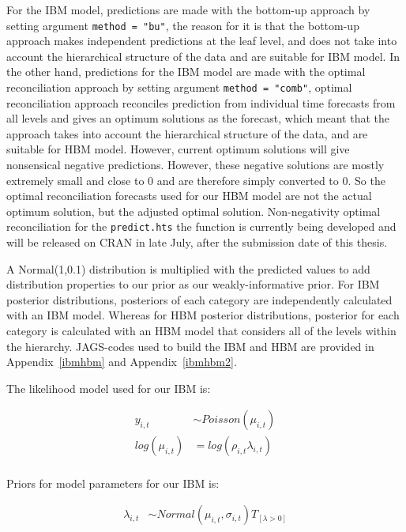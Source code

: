 For the IBM model, predictions are made with the bottom-up approach by setting argument \texttt{method = "bu"}, the reason for it is that the bottom-up approach makes independent predictions at the leaf level, and does not take into account the hierarchical structure of the data and are suitable for IBM model. In the other hand, predictions for the IBM model are made with the optimal reconciliation approach by setting argument \texttt{method = "comb"}, optimal reconciliation approach reconciles prediction from individual time forecasts from all levels and gives an optimum solutions as the forecast, which meant that the approach takes into account the hierarchical structure of the data, and are suitable for HBM model. However, current optimum solutions will give nonsensical negative predictions. However, these negative solutions are mostly extremely small and close to 0 and are therefore simply converted to 0. So the optimal reconciliation forecasts used for our HBM model are not the actual optimum solution, but the adjusted optimal solution. Non-negativity optimal reconciliation for the \texttt{predict.hts} the function is currently being developed and will be released on CRAN in late July, after the submission date of this thesis. 

\newpara

A Normal(1,0.1) distribution is multiplied with the predicted values to add distribution properties to our prior as our weakly-informative prior. For IBM posterior distributions, posteriors of each category are independently calculated with an IBM model. Whereas for HBM posterior distributions, posterior for each category is calculated with an HBM model that considers all of the levels within the hierarchy. JAGS-codes used to build the IBM and HBM are provided in Appendix~\ref{ibmhbm} and Appendix~\ref{ibmhbm2}. 

\newpara

The likelihood model used for our IBM is:

\begin{equation} \label{ibma8}
\begin{aligned}
y_{i,t} & \sim Poisson(\mu_{i,t}) \\  
log(\mu_{i,t}) & = log(\rho_{i,t}\lambda_{i,t}) \\
\end{aligned}
\end{equation}

Priors for model parameters for our IBM is:

\begin{equation} \label{ibm8b}
\begin{aligned}
\lambda_{i,t} & \sim Normal(\mu_{i,t},\sigma_{i,t}) T_{[\lambda>0]}\\
\end{aligned}
\end{equation}

